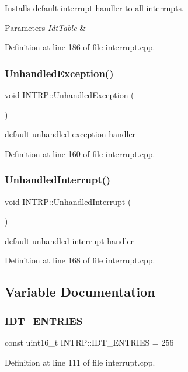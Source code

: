 Installs default interrupt handler to all interrupts. 


\begin{DoxyParams}{Parameters}
{\em Idt\+Table} & \\
\hline
\end{DoxyParams}


Definition at line 186 of file interrupt.\+cpp.

\mbox{\label{namespace_i_n_t_r_p_a7732859732913734b09dd07030c41991}} 
\subsubsection{\texorpdfstring{Unhandled\+Exception()}{UnhandledException()}}
{\footnotesize\ttfamily void I\+N\+T\+R\+P\+::\+Unhandled\+Exception (\begin{DoxyParamCaption}{ }\end{DoxyParamCaption})}



default unhandled exception handler 



Definition at line 160 of file interrupt.\+cpp.

\mbox{\label{namespace_i_n_t_r_p_a13c03019c9d7b305743516310096a82a}} 
\subsubsection{\texorpdfstring{Unhandled\+Interrupt()}{UnhandledInterrupt()}}
{\footnotesize\ttfamily void I\+N\+T\+R\+P\+::\+Unhandled\+Interrupt (\begin{DoxyParamCaption}{ }\end{DoxyParamCaption})}



default unhandled interrupt handler 



Definition at line 168 of file interrupt.\+cpp.



\subsection{Variable Documentation}
\mbox{\label{namespace_i_n_t_r_p_a1022b4dc1d9af1ea393f7f038ff421ce}} 
\subsubsection{\texorpdfstring{I\+D\+T\+\_\+\+E\+N\+T\+R\+I\+ES}{IDT\_ENTRIES}}
{\footnotesize\ttfamily const uint16\+\_\+t I\+N\+T\+R\+P\+::\+I\+D\+T\+\_\+\+E\+N\+T\+R\+I\+ES = 256}



Definition at line 111 of file interrupt.\+cpp.

